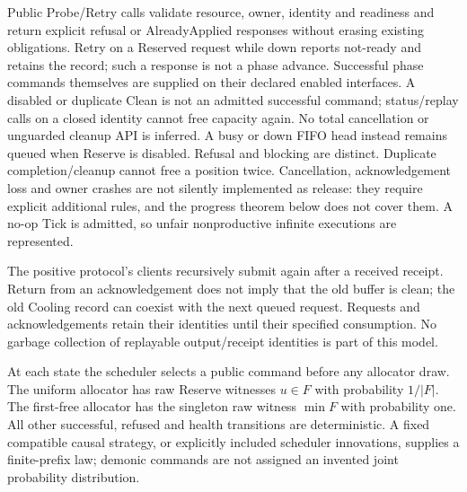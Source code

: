 \documentclass[11pt]{article}
\begin{document}
Public Probe/Retry calls validate resource, owner, identity and readiness and return explicit refusal or AlreadyApplied responses without erasing existing obligations. Retry on a Reserved request while down reports not-ready and retains the record; such a response is not a phase advance. Successful phase commands themselves are supplied on their declared enabled interfaces. A disabled or duplicate Clean is not an admitted successful command; status/replay calls on a closed identity cannot free capacity again. No total cancellation or unguarded cleanup API is inferred. A busy or down FIFO head instead remains queued when Reserve is disabled. Refusal and blocking are distinct. Duplicate completion/cleanup cannot free a position twice. Cancellation, acknowledgement loss and owner crashes are not silently implemented as release: they require explicit additional rules, and the progress theorem below does not cover them. A no-op Tick is admitted, so unfair nonproductive infinite executions are represented.

The positive protocol's clients recursively submit again after a received receipt. Return from an acknowledgement does not imply that the old buffer is clean; the old Cooling record can coexist with the next queued request. Requests and acknowledgements retain their identities until their specified consumption. No garbage collection of replayable output/receipt identities is part of this model.

At each state the scheduler selects a public command before any allocator draw. The uniform allocator has raw Reserve witnesses $u\in F$ with probability $1/|F|$. The first-free allocator has the singleton raw witness $\min F$ with probability one. All other successful, refused and health transitions are deterministic. A fixed compatible causal strategy, or explicitly included scheduler innovations, supplies a finite-prefix law; demonic commands are not assigned an invented joint probability distribution.
\end{document}
